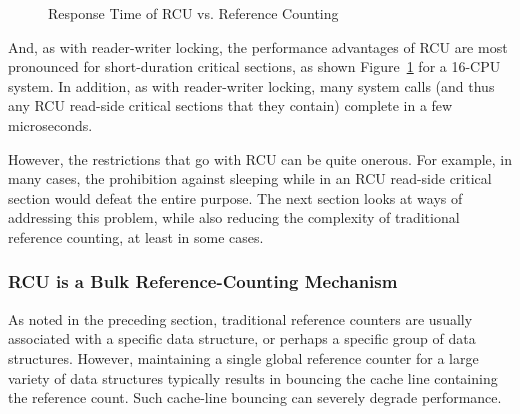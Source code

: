 \begin{figure}[tb]
\centering
{}
\caption{Response Time of RCU vs. Reference Counting}
\label{fig:defer:Response Time of RCU vs. Reference Counting}
\end{figure}

And, as with reader-writer locking, the performance advantages
of RCU are most pronounced for short-duration critical sections, as shown
Figure~\ref{fig:defer:Response Time of RCU vs. Reference Counting}
for a 16-CPU system.
In addition, as with reader-writer locking, many system calls (and thus
any RCU read-side critical sections that they contain) complete in
a few microseconds.

However, the restrictions that go with RCU can be quite onerous.
For example, in many cases, the prohibition against sleeping while in an RCU
read-side critical section would defeat the entire purpose.
The next section looks at ways of addressing this problem, while also
reducing the complexity of traditional reference counting, at least in
some cases.

\subsubsection{RCU is a Bulk Reference-Counting Mechanism}
\label{sec:defer:RCU is a Bulk Reference-Counting Mechanism}

As noted in the preceding section,
traditional reference counters are usually associated with a specific
data structure, or perhaps a specific group of data structures.
However, maintaining a single global reference counter for a large
variety of data structures typically results in bouncing
the cache line containing the reference count.
Such cache-line bouncing can severely degrade performance.

